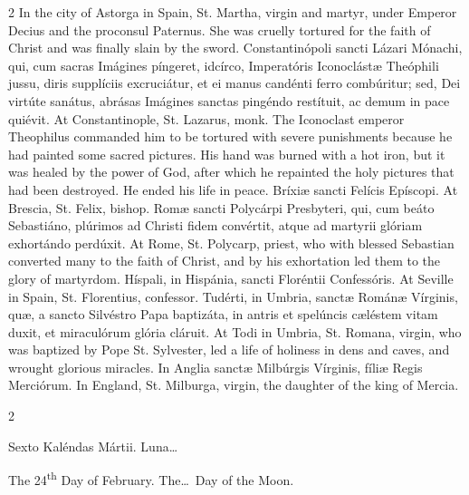 \begin{paracol}{2}
\switchcolumn
{}
In the city of Astorga in Spain, St. Martha, virgin and martyr, under 
 Emperor Decius and the proconsul Paternus. She was cruelly tortured 
 for the faith of Christ and was finally slain by the sword.
\switchcolumn*
{}
Constantinópoli sancti Lázari Mónachi, qui, cum 
 sacras Imágines píngeret, idcírco, Imperatóris Iconoclástæ Theóphili jussu, 
 diris supplíciis excruciátur, et ei manus candénti ferro combúritur; sed, 
 Dei virtúte sanátus, abrásas Imágines sanctas pingéndo restítuit, ac demum 
 in pace quiévit.
\switchcolumn
{}
At Constantinople, St. Lazarus, monk. The Iconoclast emperor 
 Theophilus commanded him to be tortured with severe punishments because he 
 had painted some sacred pictures. His hand was burned with a hot iron, 
 but it was healed by the power of God, after which he repainted the holy 
 pictures that had been destroyed. He ended his life in peace.
\switchcolumn*
{}
Bríxiæ sancti Felícis Epíscopi.
\switchcolumn
{}
At Brescia, St. Felix, bishop.
\switchcolumn*
{}
Romæ sancti Polycárpi Presbyteri, qui, cum 
 beáto Sebastiáno, plúrimos ad Christi fidem convértit, atque ad martyrii 
 glóriam exhortándo perdúxit.
\switchcolumn
{}
At Rome, St. Polycarp, priest, who with blessed Sebastian converted many to 
 the faith of Christ, and by his exhortation led them to the glory of 
 martyrdom.
\switchcolumn*
{}
Híspali, in Hispánia, sancti Floréntii 
 Confessóris.
\switchcolumn
{}
At Seville in Spain, St. Florentius, confessor.
\switchcolumn*
{}
Tudérti, in Umbria, sanctæ Románæ Vírginis, quæ, 
 a sancto Silvéstro Papa baptizáta, in antris et spelúncis cæléstem vitam 
 duxit, et miraculórum glória cláruit.
\switchcolumn
{}
At Todi in Umbria, St. Romana, virgin, who was baptized by Pope St. 
 Sylvester, led a life of holiness in dens and caves, and wrought glorious 
 miracles.
\switchcolumn*
{}
In Anglia sanctæ Milbúrgis Vírginis, fíliæ 
 Regis Merciórum.
\switchcolumn
{}
In England, St. Milburga, virgin, the daughter of the king of Mercia.
\switchcolumn*
{}
\end{paracol}


\begin{paracol}{2}
\begin{center}{\color{gregoriocolor} Sexto Kaléndas Mártii. 
 Luna\dots\ }\end{center}
\switchcolumn
{}
\begin{center}{\color{gregoriocolor} The 24\textsuperscript{th} Day of February. The\dots\ Day of the Moon.}\end{center}
\end{paracol}

